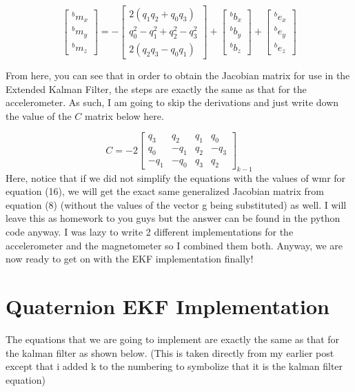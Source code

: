 \documentclass[a4paper,12pt]{book}
\begin{document}
\begin{equation}
    \begin{bmatrix} ^bm_x \\ ^bm_y \\ ^bm_z \end{bmatrix} = -\begin{bmatrix} 2(q_1q_2+q_0q_3) \\ q_0^2-q_1^2+q_2^2-q_3^2 \\ 2(q_2q_3-q_0q_1) \end{bmatrix} + \begin{bmatrix} ^bb_x \\ ^bb_y \\ ^bb_z \end{bmatrix} + \begin{bmatrix} ^be_x \\ ^be_y \\ ^be_z \end{bmatrix} 
\end{equation}

From here, you can see that in order to obtain the Jacobian matrix for use in the Extended Kalman Filter, the steps are exactly the same as that for the accelerometer. As such, I am going to skip the derivations and just write down the value of the $C$ matrix below here.

\begin{equation}
    C= -2\begin{bmatrix} q_3 & q_2 & q_1 & q_0 \\ q_0 & -q_1 & q_2 & -q_3 \\ -q_1 & -q_0 & q_3 & q_2 \end{bmatrix}_{k-1}
\end{equation}
Here, notice that if we did not simplify the equations with the values of wmr for equation (16), we will get the exact same generalized Jacobian matrix from equation (8) (without the values of the vector g being substituted) as well. I will leave this as homework to you guys but the answer can be found in the python code anyway. I was lazy to write 2 different implementations for the accelerometer and the magnetometer so I combined them both. Anyway, we are now ready to get on with the EKF implementation finally!
\section{Quaternion EKF Implementation}

The equations that we are going to implement are exactly the same as that for the kalman filter as shown below. (This is taken directly from my earlier post except that i added k to the numbering to symbolize that it is the kalman filter equation)
\end{document}
